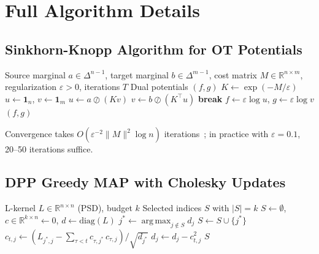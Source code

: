 \documentclass[10pt]{article}
\DeclareMathOperator*{\argmax}{arg\,max}
\begin{document}
\appendix
\newpage

\section{Full Algorithm Details}
\label{app:algorithms}

\subsection{Sinkhorn-Knopp Algorithm for OT Potentials}

\begin{algorithm}[H]
\caption{Sinkhorn-Knopp for Entropic OT}
\label{alg:sinkhorn}
\begin{algorithmic}[1]
\REQUIRE Source marginal $a \in \Delta^{n-1}$, target marginal $b \in \Delta^{m-1}$, cost matrix $M \in \mathbb{R}^{n \times m}$, regularization $\varepsilon > 0$, iterations $T$
\ENSURE Dual potentials $(f, g)$
\STATE $K \leftarrow \exp(-M/\varepsilon)$
\STATE $u \leftarrow \mathbf{1}_n$, $v \leftarrow \mathbf{1}_m$
  \STATE $u \leftarrow a \oslash (K v)$
  \STATE $v \leftarrow b \oslash (K^\top u)$
    \STATE \textbf{break}
  \ENDIF
\ENDFOR
\STATE $f \leftarrow \varepsilon \log u$, $g \leftarrow \varepsilon \log v$
\RETURN $(f, g)$
\end{algorithmic}
\end{algorithm}

Convergence takes $O(\varepsilon^{-2} \|M\|^2 \log n)$ iterations~\citep{cuturi2013sinkhorn}; in practice with $\varepsilon = 0.1$, 20--50 iterations suffice.

\subsection{DPP Greedy MAP with Cholesky Updates}

\begin{algorithm}[H]
\caption{Greedy MAP Inference for DPP}
\label{alg:dpp}
\begin{algorithmic}[1]
\REQUIRE L-kernel $L \in \mathbb{R}^{n \times n}$ (PSD), budget $k$
\ENSURE Selected indices $S$ with $|S| = k$
\STATE $S \leftarrow \emptyset$, $c \in \mathbb{R}^{k \times n} \leftarrow 0$, $d \leftarrow \mathrm{diag}(L)$
  \STATE $j^* \leftarrow \argmax_{j \notin S} d_j$
  \STATE $S \leftarrow S \cup \{j^*\}$
    \STATE $c_{t,j} \leftarrow (L_{j^*,j} - \sum_{\tau < t} c_{\tau,j^*}\, c_{\tau,j}) / \sqrt{d_{j^*}}$
    \STATE $d_j \leftarrow d_j - c_{t,j}^2$
  \ENDFOR
\ENDFOR
\RETURN $S$
\end{algorithmic}
\end{algorithm}
\end{document}

